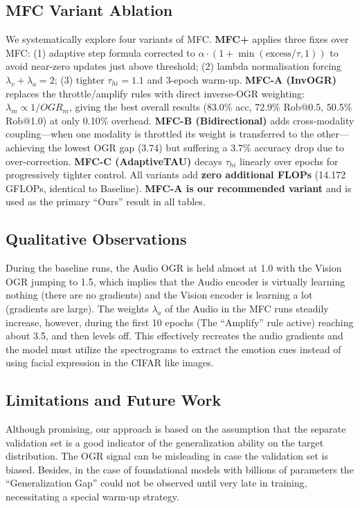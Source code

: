 \documentclass[10pt, twocolumn, letterpaper]{article}
\begin{document}
\subsection{MFC Variant Ablation}
We systematically explore four variants of MFC. \textbf{MFC+} applies three fixes over MFC: (1) adaptive step formula corrected to $\alpha \cdot (1 + \min(\text{excess}/\tau, 1))$ to avoid near-zero updates just above threshold; (2) lambda normalisation forcing $\lambda_v + \lambda_a = 2$; (3) tighter $\tau_{hi}{=}1.1$ and 3-epoch warm-up. \textbf{MFC-A (InvOGR)} replaces the throttle/amplify rules with direct inverse-OGR weighting: $\lambda_m \propto 1/OGR_m$, giving the best overall results (83.0\% acc, 72.9\% Rob@0.5, 50.5\% Rob@1.0) at only 0.10\% overhead. \textbf{MFC-B (Bidirectional)} adds cross-modality coupling---when one modality is throttled its weight is transferred to the other---achieving the lowest OGR gap (3.74) but suffering a 3.7\% accuracy drop due to over-correction. \textbf{MFC-C (AdaptiveTAU)} decays $\tau_{hi}$ linearly over epochs for progressively tighter control. All variants add \textbf{zero additional FLOPs} (14.172 GFLOPs, identical to Baseline). \textbf{MFC-A is our recommended variant} and is used as the primary ``Ours'' result in all tables.

\subsection{Qualitative Observations}
During the baseline runs, the Audio OGR is held almost at 1.0 with the Vision OGR jumping to 1.5, which implies that the Audio encoder is virtually learning nothing (there are no gradients) and the Vision encoder is learning a lot (gradients are large). The weights $\lambda_a$ of the Audio in the MFC runs steadily increase, however, during the first 10 epochs (The ``Amplify'' rule active) reaching about 3.5, and then levels off. This effectively recreates the audio gradients and the model must utilize the spectrograms to extract the emotion cues instead of using facial expression in the CIFAR like images.

\subsection{Limitations and Future Work}
Although promising, our approach is based on the assumption that the separate validation set is a good indicator of the generalization ability on the target distribution. The OGR signal can be misleading in case the validation set is biased. Besides, in the case of foundational models with billions of parameters the ``Generalization Gap'' could not be observed until very late in training, necessitating a special warm-up strategy.
\end{document}
